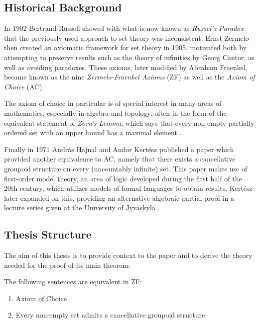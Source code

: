 \documentclass[../../main.tex]{subfiles}
\begin{document}
\subsection*{Historical Background}

In 1902 Bertrand Russell showed with what is now known as \textit{Russel's Paradox} that the previously used approach to set theory was inconsistent.
Ernst Zermelo then created an axiomatic framework for set theory in 1905, motivated both by attempting to preserve results such as the theory of infinities by Georg Cantor, as well as avoiding paradoxes.
These axioms, later modified by Abraham Fraenkel, became known as the nine \textit{Zermelo-Fraenkel Axioms} (ZF) as well as the \textit{Axiom of Choice} (AC)\cite[pp.66-70, 75]{Gol17}.

The axiom of choice in particular is of special interest in many areas of mathematics, especially in algebra and topology, often in the form of the equivalent statement of \textit{Zorn's Lemma},
which says that every non-empty partially ordered set with an upper bound has a maximal element \cite{Jec78}.

Finally in 1971 András Hajnal and Andor Kertész published a paper \cite{Haj72} which provided another equivalence to AC, namely that there exists a cancellative groupoid structure on every (uncountably infinite) set.
This paper makes use of first-order model theory, an area of logic developed during the first half of the 20th century, which utilizes models of formal languages to obtain results.
Kertész later expanded on this, providing an alternative algebraic partial proof in a lecture series given at the University of Jyväskylä \cite{Ker75}.

\subsection*{Thesis Structure}

The aim of this thesis is to provide context to the paper \cite{Haj72} and to derive the theory needed for the proof of its main theorem:
\begin{theorem}
    The following sentences are equivalent in ZF:
    \begin{enumerate}
        \item Axiom of Choice
        \item Every non-empty set admits a cancellative groupoid structure
    \end{enumerate}
\end{theorem}
\end{document}
